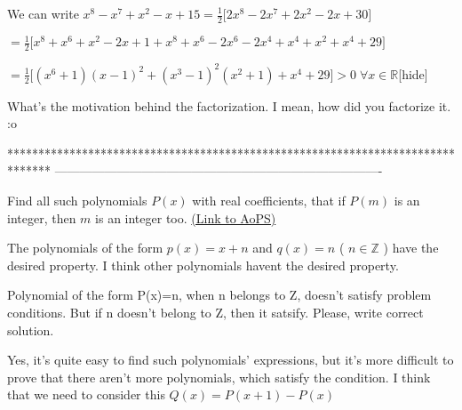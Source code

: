 \begin{solution}
	\begin{tcolorbox}
[hide = Alternate] We can write $x^8-x^7+x^2-x+15 = \frac{1}{2}\bigg[2x^8-2x^7+2x^2-2x+30\bigg]$

$ = \frac{1}{2}\bigg[x^8+x^6+x^2-2x+1+x^8+x^6-2x^6-2x^4+x^4+x^2+x^4+29\bigg]$

$ = \frac{1}{2}\bigg[(x^6+1)(x-1)^2+(x^3-1)^2(x^2+1)+x^4+29\bigg]>0\;\forall x \in \mathbb{R}$[\/hide]\end{tcolorbox}
What's the motivation behind the factorization. I mean, how did you factorize it. :o

\end{solution}
*******************************************************************************
-------------------------------------------------------------------------------

\begin{problem}
	Find all such polynomials $P(x)$ with real coefficients, that if $P(m)$ is an integer, then $m$ is an integer too.
	\flushright \href{https://artofproblemsolving.com/community/c6h529365}{(Link to AoPS)}
\end{problem}



\begin{solution}
	The polynomials of the form $p(x) = x + n$ and  $q(x) = n$ ( $n \in \mathbb{Z}$ ) have the desired property. I think other polynomials havent the desired property.
\end{solution}



\begin{solution}
	Polynomial of the form P(x)=n, when n belongs to Z, doesn't satisfy problem conditions. But if n doesn't belong to Z, then it satsify. Please, write correct solution.
\end{solution}



\begin{solution}
	Yes, it's quite easy to find such polynomials' expressions, but it's more difficult to prove that there aren't more polynomials, which satisfy the condition. I think that we need to consider this $Q(x) = P(x+1)-P(x)$
\end{solution}



